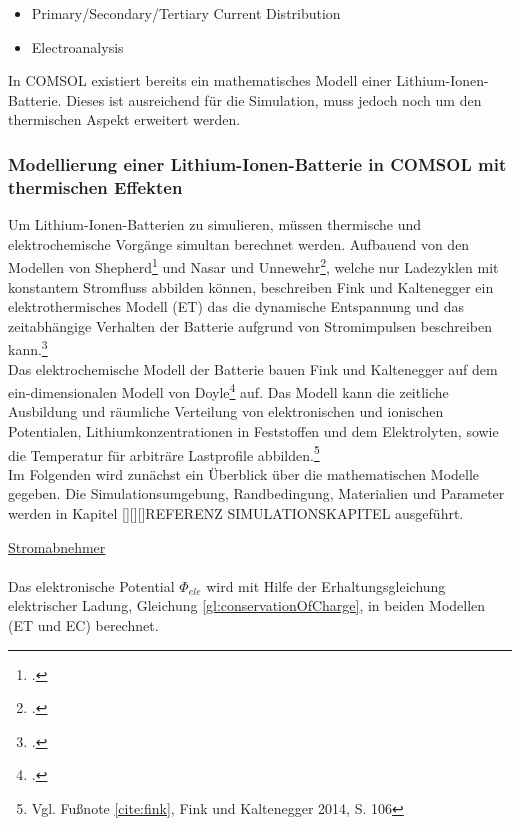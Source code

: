 \begin{itemize}
	\item Primary/Secondary/Tertiary Current Distribution
	\item Electroanalysis
\end{itemize}

In COMSOL\textsuperscript{\textregistered} existiert bereits ein mathematisches Modell einer Lithium-Ionen-Batterie. Dieses ist ausreichend für die Simulation, muss jedoch noch um den thermischen Aspekt erweitert werden.\\

\subsubsection*{Modellierung einer Lithium-Ionen-Batterie in COMSOL\textsuperscript{\textregistered} mit thermischen Effekten}\label{subsub:modellthermalLIB}

Um Lithium-Ionen-Batterien zu simulieren, müssen thermische und elektrochemische Vorgänge simultan berechnet werden. Aufbauend von den Modellen von Shepherd\footcite[Vgl.][]{Shepherd.1965} und Nasar und Unnewehr\footcite[Vgl.][]{Nasar.1982}, welche nur Ladezyklen mit konstantem Stromfluss abbilden können, beschreiben Fink und Kaltenegger ein elektrothermisches Modell (ET) das die dynamische Entspannung und das zeitabhängige Verhalten der Batterie aufgrund von Stromimpulsen beschreiben kann.\footcite[Vgl.\label{cite:fink}][S. 105-124]{Fink.2014} \\
Das elektrochemische Modell der Batterie bauen Fink und Kaltenegger auf dem ein-dimensionalen Modell von Doyle\footcite[Vgl.][S. 1890-1903]{Doyle.1996} auf. Das Modell kann die zeitliche Ausbildung und räumliche Verteilung von elektronischen und ionischen Potentialen, Lithiumkonzentrationen in Feststoffen und dem Elektrolyten, sowie die Temperatur für arbiträre Lastprofile abbilden.\footnote{Vgl. Fußnote \ref{cite:fink}, Fink und Kaltenegger 2014, S. 106}\\
Im Folgenden wird zunächst ein Überblick über die mathematischen Modelle gegeben. Die Simulationsumgebung, Randbedingung, Materialien und Parameter werden in Kapitel [][][]REFERENZ SIMULATIONSKAPITEL %
ausgeführt.\newline

\underline{Stromabnehmer}\\
\\
Das elektronische Potential $\Phi_{ele}$ wird mit Hilfe der Erhaltungsgleichung elektrischer Ladung, Gleichung \ref{gl:conservationOfCharge}, in beiden Modellen (ET und EC) berechnet.


